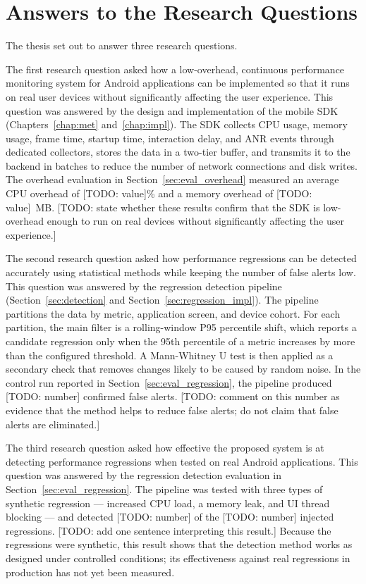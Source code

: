\section{Answers to the Research Questions}
\label{sec:concl_rq}

The thesis set out to answer three research questions.

The first research question asked how a low-overhead, continuous performance monitoring system for Android applications can be implemented so that it runs on real user devices without significantly affecting the user experience. This question was answered by the design and implementation of the mobile SDK (Chapters~\ref{chap:met} and~\ref{chap:impl}). The SDK collects CPU usage, memory usage, frame time, startup time, interaction delay, and ANR events through dedicated collectors, stores the data in a two-tier buffer, and transmits it to the backend in batches to reduce the number of network connections and disk writes. The overhead evaluation in Section~\ref{sec:eval_overhead} measured an average CPU overhead of [TODO: value]\% and a memory overhead of [TODO: value]~MB. [TODO: state whether these results confirm that the SDK is low-overhead enough to run on real devices without significantly affecting the user experience.]

The second research question asked how performance regressions can be detected accurately using statistical methods while keeping the number of false alerts low. This question was answered by the regression detection pipeline (Section~\ref{sec:detection} and Section~\ref{sec:regression_impl}). The pipeline partitions the data by metric, application screen, and device cohort. For each partition, the main filter is a rolling-window P95 percentile shift, which reports a candidate regression only when the 95th percentile of a metric increases by more than the configured threshold. A Mann-Whitney U test is then applied as a secondary check that removes changes likely to be caused by random noise. In the control run reported in Section~\ref{sec:eval_regression}, the pipeline produced [TODO: number] confirmed false alerts. [TODO: comment on this number as evidence that the method helps to reduce false alerts; do not claim that false alerts are eliminated.]

The third research question asked how effective the proposed system is at detecting performance regressions when tested on real Android applications. This question was answered by the regression detection evaluation in Section~\ref{sec:eval_regression}. The pipeline was tested with three types of synthetic regression — increased CPU load, a memory leak, and UI thread blocking — and detected [TODO: number] of the [TODO: number] injected regressions. [TODO: add one sentence interpreting this result.] Because the regressions were synthetic, this result shows that the detection method works as designed under controlled conditions; its effectiveness against real regressions in production has not yet been measured.

